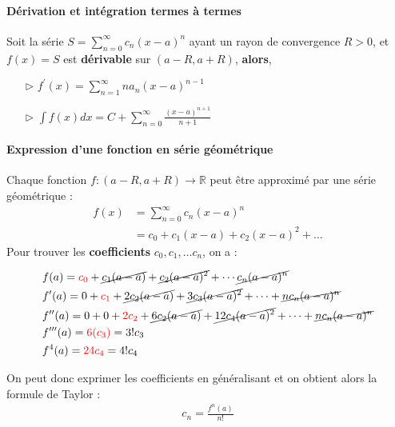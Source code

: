 \documentclass{report}
\begin{document}
\begin{multicols*}{3}
  \paragraph{Dérivation et intégration termes à termes}
  Soit la série $S = \sum_{n=0}^{\infty }c_n(x - a)^n$ 
  ayant un rayon de convergence $R > 0$, et $f(x) = S$ est 
  \textbf{dérivable} sur $(a-R, a + R)$, \textbf{alors},     
  \begin{itemize}
    \item [$\rhd$ ] $f^{\prime}(x) = \sum_{n=1}^{\infty }na_n(x-a)^{n-1}$ 
    \item [$\rhd$ ] $\int f(x) dx = 
           C + \sum_{n=0}^{\infty }\frac{(x-a)^{n+1}}{n+1}$
  \end{itemize}

  \paragraph{Expression d'une fonction en série géométrique}
  Chaque fonction $f : (a - R, a + R) \rightarrow \mathbb{R}$ peut être 
  approximé par une série géométrique :
  \begin{align*}
      f(x) &= \sum_{n=0}^{\infty }c_n(x - a)^n \\ 
           &= c_0 + c_1(x - a) + c_2(x - a)^2 + \dots
  \end{align*}    
  Pour trouver les \textbf{coefficients} $c_0, c_1, \dots c_n$, on a :

  \tiny{
  
  \begin{align*}
    &f(a)  = \textcolor{red}{c_0}   + 
      \cancel{c_1(a - a)} + \cancel{c_2(a - a)^2} + \cdots 
            \cancel{c_n(a - a)^n } \\ 
    &f^{\prime}(a) = 0 + \textcolor{red}{c_1} + 
          \cancel{2c_2(a - a)} + \cancel{3c_3(a - a)^2} + \cdots 
          + \cancel{nc_n(a - a)^n} \\
    &f^{\prime\prime}(a) = 0 + 0 + \textcolor{red}{2c_2} + 
          \cancel{6c_2(a - a)} + \cancel{12c_4(a - a)^2} + \cdots 
          + \cancel{nc_n(a - a)^n} \\
    &f^{\prime\prime\prime}(a) = \textcolor{red}{6(c_3)} 
                = 3!c_3 \\
    &f^{4}(a) = \textcolor{red}{24c_4} = 4!c_4  
  \end{align*}  
  }
  \noindent
  On peut donc exprimer les coefficients en généralisant et on 
  obtient 
  alors la formule de Taylor :
  \begin{align*}
        c_n =  \frac{f^{n}(a)}{n!} 
  \end{align*}


\end{multicols*}
\end{document}
